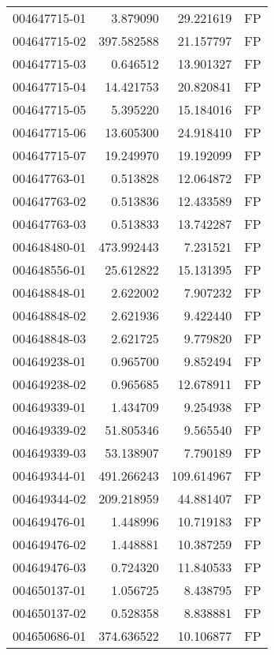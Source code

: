\begin{tabular}{lrrl}
004647715-01 &    3.879090 &      29.221619 &   FP \\
004647715-02 &  397.582588 &      21.157797 &   FP \\
004647715-03 &    0.646512 &      13.901327 &   FP \\
004647715-04 &   14.421753 &      20.820841 &   FP \\
004647715-05 &    5.395220 &      15.184016 &   FP \\
004647715-06 &   13.605300 &      24.918410 &   FP \\
004647715-07 &   19.249970 &      19.192099 &   FP \\
004647763-01 &    0.513828 &      12.064872 &   FP \\
004647763-02 &    0.513836 &      12.433589 &   FP \\
004647763-03 &    0.513833 &      13.742287 &   FP \\
004648480-01 &  473.992443 &       7.231521 &   FP \\
004648556-01 &   25.612822 &      15.131395 &   FP \\
004648848-01 &    2.622002 &       7.907232 &   FP \\
004648848-02 &    2.621936 &       9.422440 &   FP \\
004648848-03 &    2.621725 &       9.779820 &   FP \\
004649238-01 &    0.965700 &       9.852494 &   FP \\
004649238-02 &    0.965685 &      12.678911 &   FP \\
004649339-01 &    1.434709 &       9.254938 &   FP \\
004649339-02 &   51.805346 &       9.565540 &   FP \\
004649339-03 &   53.138907 &       7.790189 &   FP \\
004649344-01 &  491.266243 &     109.614967 &   FP \\
004649344-02 &  209.218959 &      44.881407 &   FP \\
004649476-01 &    1.448996 &      10.719183 &   FP \\
004649476-02 &    1.448881 &      10.387259 &   FP \\
004649476-03 &    0.724320 &      11.840533 &   FP \\
004650137-01 &    1.056725 &       8.438795 &   FP \\
004650137-02 &    0.528358 &       8.838881 &   FP \\
004650686-01 &  374.636522 &      10.106877 &   FP \\

\end{tabular}
